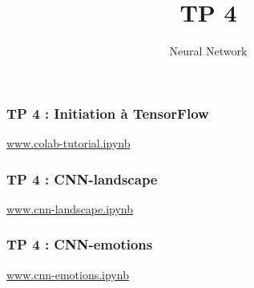 \documentclass{formation}
\title{TP 4}
\subtitle{Neural Network}
\begin{document}
\maketitle

\begin{frame}
  \frametitle{TP 4 : Initiation à TensorFlow}
  \begin{center}
    \href{https://colab.research.google.com/notebooks/welcome.ipynb}{www.colab-tutorial.ipynb}
  \end{center}
\end{frame}

\begin{frame}
  \frametitle{TP 4 : CNN-landscape}
  \begin{center}
    \href{https://colab.research.google.com/drive/1wS56Bvj0KNGqMHIviwd2Y9uwYnUYkT5b}{www.cnn-landscape.ipynb}
  \end{center}
\end{frame}

\begin{frame}
  \frametitle{TP 4 : CNN-emotions}
  \begin{center}
    \href{https://colab.research.google.com/drive/1o-bJu3E70FwL9twPU3R4L9epTL9rE3dI}{www.cnn-emotions.ipynb}
  \end{center}
\end{frame}
\end{document}
